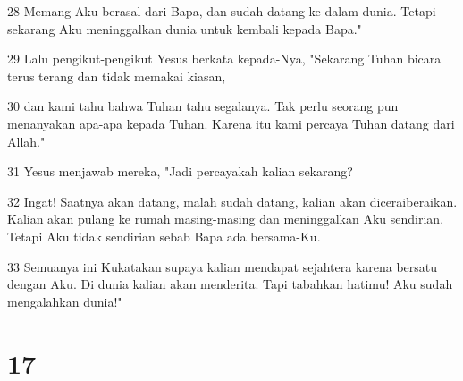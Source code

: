 \par 28 Memang Aku berasal dari Bapa, dan sudah datang ke dalam dunia. Tetapi sekarang Aku meninggalkan dunia untuk kembali kepada Bapa."
\par 29 Lalu pengikut-pengikut Yesus berkata kepada-Nya, "Sekarang Tuhan bicara terus terang dan tidak memakai kiasan,
\par 30 dan kami tahu bahwa Tuhan tahu segalanya. Tak perlu seorang pun menanyakan apa-apa kepada Tuhan. Karena itu kami percaya Tuhan datang dari Allah."
\par 31 Yesus menjawab mereka, "Jadi percayakah kalian sekarang?
\par 32 Ingat! Saatnya akan datang, malah sudah datang, kalian akan diceraiberaikan. Kalian akan pulang ke rumah masing-masing dan meninggalkan Aku sendirian. Tetapi Aku tidak sendirian sebab Bapa ada bersama-Ku.
\par 33 Semuanya ini Kukatakan supaya kalian mendapat sejahtera karena bersatu dengan Aku. Di dunia kalian akan menderita. Tapi tabahkan hatimu! Aku sudah mengalahkan dunia!"

\chapter{17}

